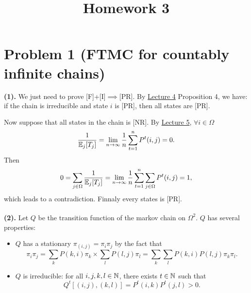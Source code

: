 \documentclass{article}
\begin{document}
\title{\vspace{-1.5cm}Homework 3}
\maketitle
\section*{Problem 1 (FTMC for countably infinite chains)}

\textbf{(1).}
We just need to prove [F]+[I]$\implies$[PR].
By \href{http://chihaozhang.com/teaching/SP2022spring/notes/lec4.pdf}{Lecture 4} Proposition 4, we have: if the chain is irreducible and state $i$ is [PR], then all states are [PR].

Now suppose that all states in the chain is [NR]. By \href{http://chihaozhang.com/teaching/SP2022spring/notes/lec5.pdf}{Lecture 5}, $\forall i\in\Omega$
\[
	\frac{1}{\=E_j[T_j]}=\lim_{n\to\infty}\frac{1}{n}\sum_{t=1}^nP^t(i,j)=0
.\] 
Then
\[
	0=\sum_{j\in\Omega} \frac{1}{\=E_j[T_j]}=\lim_{n\to\infty}\frac{1}{n}\sum_{t=1}^n\sum_{j\in\Omega}P^t(i,j)=1
,\]
which leads to a contradiction. Finnaly every states is [PR].
\\\\
% 
\textbf{(2).} Let $Q$ be the transition function of the markov chain on $\Omega^2$. $Q$ has several properties:
\begin{itemize}
	\item
	      $Q$ has a stationary  $\pi_{(i,j)}=\pi_i\pi_j$ by the fact that
	      \[
		      \pi_i\pi_j
		      =
		      \sum_kP(k,i)\pi_k\times\sum_lP(l,j)\pi_l
		      =
		      \sum_k\sum_lP(k,i)P(l,j)\pi_k\pi_l
		      .\]
	\item
	      $Q$ is irreducible: for all $i,j,k,l\in\NN$, there exists $t\in\NN$ such that
	      \[
		      Q^t[(i,j),(k,l)]=P^t(i,k)P^t(j,l)>0
		      .\]
\end{itemize}
\end{document}
